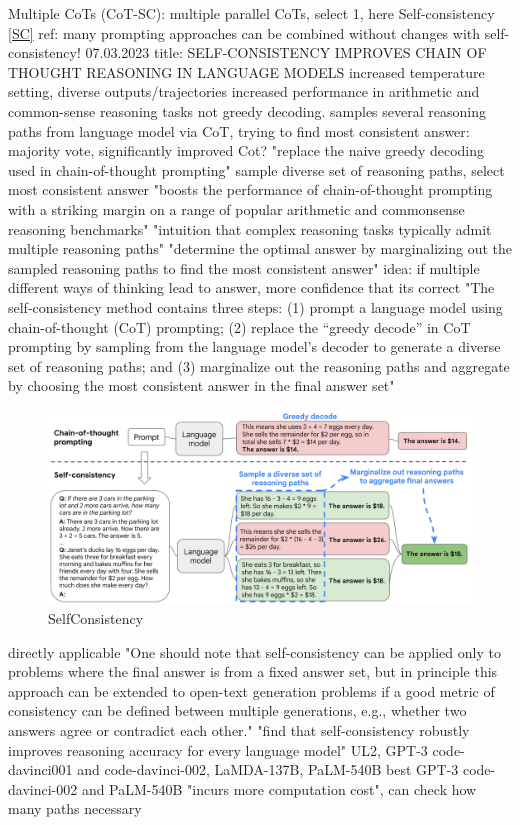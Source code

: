 \documentclass{article}
\begin{document}
Multiple CoTs (CoT-SC): multiple parallel CoTs, select 1, here Self-consistency \ref{SC}
ref: many prompting approaches can be combined without changes with self-consistency!
 \cite{wang_self-consistency_2023} 07.03.2023 title: SELF-CONSISTENCY IMPROVES CHAIN OF THOUGHT REASONING IN LANGUAGE MODELS
increased temperature setting, diverse outputs/trajectories
increased performance in arithmetic and common-sense reasoning tasks
not greedy decoding. samples several reasoning paths from language model via CoT, trying to find most consistent answer: majority vote, significantly improved Cot?
"replace the naive greedy decoding used in chain-of-thought prompting"
sample diverse set of reasoning paths, select most consistent answer
"boosts the performance of chain-of-thought prompting with a striking margin on a range of popular arithmetic and commonsense reasoning benchmarks"
"intuition that complex reasoning tasks typically admit multiple reasoning paths"
"determine the optimal answer by marginalizing out the sampled reasoning paths to find the most consistent answer" idea: if multiple different ways of thinking lead to answer, more confidence that its correct
"The self-consistency method contains three steps: (1) prompt a language model using chain-of-thought (CoT) prompting; (2) replace the “greedy decode” in CoT prompting by sampling from the language model’s decoder to generate a diverse set of reasoning paths; and (3) marginalize out the reasoning paths and aggregate by choosing the most consistent answer in the final answer set"
\begin{figure}[h]
	\centering
	\includegraphics[width=0.7\linewidth]{SelfConsistency.png}
	\caption{SelfConsistency  \cite{wang_self-consistency_2023}}
	\label{fig:selfconsistency}
\end{figure}
directly applicable
"One should note that self-consistency can be applied only to problems where the final answer is from a fixed answer set, but in principle this approach can be extended to open-text generation problems if a good metric of consistency can be defined between multiple generations, e.g., whether two answers agree or contradict each other."
"find that self-consistency robustly improves reasoning accuracy for every language model"
UL2, GPT-3 code-davinci001 and code-davinci-002, LaMDA-137B, PaLM-540B
best GPT-3 code-davinci-002 and PaLM-540B
"incurs more computation cost", can check how many paths necessary
\end{document}
